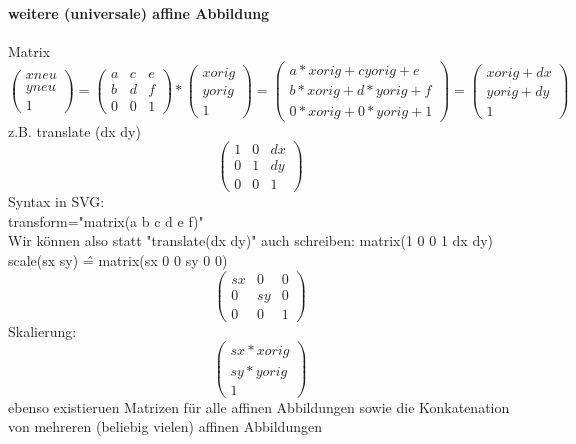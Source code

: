 \paragraph{weitere (universale) affine Abbildung}
Matrix\\
\[
\left( {\begin{array}{c}
xneu \\
yneu \\
1
\end{array} } \right)
=
\left( {\begin{array}{ccc}
a & c & e \\
b & d & f \\
0 & 0 & 1
\end{array} } \right)
*
\left( {\begin{array}{c}
xorig \\
yorig \\
1
\end{array} } \right)
=
\left( {\begin{array}{c}
a*xorig + cyorig + e \\
b*xorig + d*yorig + f \\
0*xorig + 0*yorig + 1
\end{array} } \right)
=
\left( {\begin{array}{c}
xorig + dx \\
yorig + dy\\
1
\end{array} } \right)
\] 
z.B. translate (dx dy)
\[
\left( {\begin{array}{ccc}
1 & 0 & dx \\
0 & 1 & dy \\
0 & 0 & 1
\end{array} } \right)
\] 
Syntax in SVG:\\
transform="matrix(a b c d e f)"\\
Wir können also statt "translate(dx dy)" auch schreiben: matrix(1 0 0 1 dx dy)\\
scale(sx sy) \^= matrix(sx 0 0 sy 0 0)
\[
\left( {\begin{array}{ccc}
sx & 0 & 0 \\
0 & sy & 0 \\
0 & 0 & 1
\end{array} } \right)
\]
Skalierung:
\[
\left( {\begin{array}{c}
sx*xorig \\
sy*yorig \\
1
\end{array} } \right)
\] 
ebenso existieruen Matrizen für alle affinen Abbildungen sowie die Konkatenation von mehreren (beliebig vielen) affinen Abbildungen
